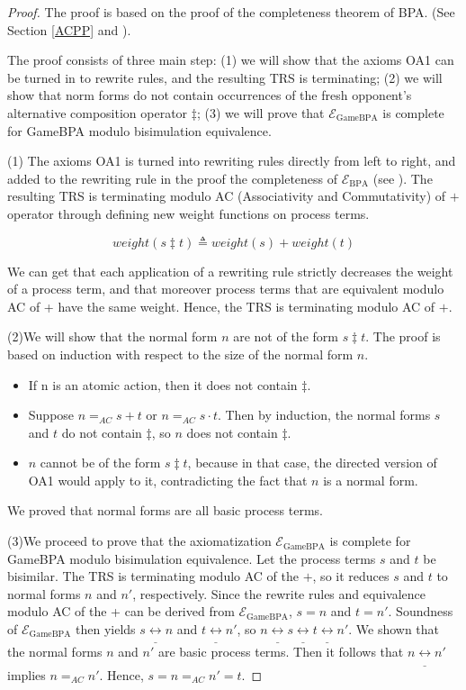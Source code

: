 \documentclass{fac}
\begin{document}
\begin{proof}
The proof is based on the proof of the completeness theorem of BPA. (See Section \ref{ACPP} and \cite{ACP}).

The proof consists of three main step: (1) we will show that the axioms OA1 can be turned in to rewrite rules, and the resulting TRS is terminating; (2) we will show that norm forms do not contain occurrences of the fresh opponent's alternative composition operator $\ddagger$; (3) we will prove that $\mathcal{E}_{\textrm{GameBPA}}$ is complete for GameBPA modulo bisimulation equivalence.

(1) The axioms OA1 is turned into rewriting rules directly from left to right, and added to the rewriting rule in the proof the completeness of $\mathcal{E}_{\textrm{BPA}}$ (see \cite{ACP}). The resulting TRS is terminating modulo AC (Associativity and Commutativity) of $+$ operator through defining new weight functions on process terms.

$$
weight(s\ddagger t)\triangleq weight(s) + weight(t)
$$

We can get that each application of a rewriting rule strictly decreases the weight of a process term, and that moreover process terms that are equivalent modulo AC of + have the same weight. Hence, the TRS is terminating modulo AC of $+$.

(2)We will show that the normal form $n$ are not of the form $s\ddagger t$. The proof is based on induction with respect to the size of the normal form $n$.

\begin{itemize}
  \item If n is an atomic action, then it does not contain $\ddagger$.
  \item Suppose $n =_{AC} s + t$ or $n =_{AC} s \cdot t$. Then by induction, the normal forms $s$ and $t$ do not contain $\ddagger$, so $n$ does not contain $\ddagger$.
  \item $n$ cannot be of the form $s \ddagger t$, because in that case, the directed version of OA1 would apply to it, contradicting the fact that $n$ is a normal form.
\end{itemize}

We proved that normal forms are all basic process terms.

(3)We proceed to prove that the axiomatization $\mathcal{E}_{\textrm{GameBPA}}$ is complete for GameBPA modulo bisimulation equivalence. Let the process terms $s$ and $t$ be bisimilar. The TRS is terminating modulo AC of the $+$, so it reduces $s$ and $t$ to normal forms $n$ and $n'$, respectively. Since the rewrite rules and equivalence modulo AC of the + can be derived from $\mathcal{E}_{\textrm{GameBPA}}$, $s = n$ and $t = n'$. Soundness of $\mathcal{E}_{\textrm{GameBPA}}$ then yields $s\underline{\leftrightarrow} n$ and $t \underline{\leftrightarrow} n'$, so $n\underline{\leftrightarrow} s \underline{\leftrightarrow} t \underline{\leftrightarrow} n'$. We shown that the normal forms $n$ and $n'$ are basic process terms. Then it follows that $n\underline{\leftrightarrow} n'$ implies $n =_{AC} n'$. Hence, $s = n =_{AC} n' = t$.
\end{proof}
\end{document}
